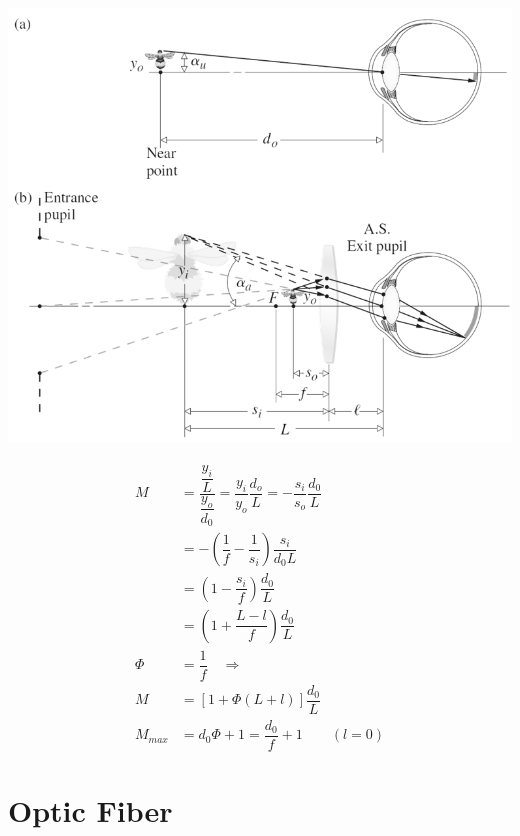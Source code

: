 \begin{minipage}[htbp]{0.7\linewidth}
  \includegraphics[width=\linewidth]{figures/magnifier.png}
\end{minipage}
\begin{minipage}[htbp]{0.3\linewidth}
  \begin{equation*}
    \begin{aligned}
      M &= \dfrac{\dfrac{y_i}{L} }{\dfrac{y_o}{d_0} } = \dfrac{y_i}{y_o} \dfrac{d_o}{L} = - \dfrac{s_i}{s_o} \dfrac{d_0}{L} \\
      &= - \left( \dfrac{1}{f} - \dfrac{1}{s_i}   \right) \dfrac{s_i}{d_0 L}  \\
      &= \left( 1 - \dfrac{s_i}{f}  \right) \dfrac{d_0}{L} \\
      &= \left( 1 + \dfrac{L - l}{f}  \right)\dfrac{d_0}{L} \\
      \Phi &= \dfrac{1}{f} \quad \Rightarrow \quad \\
      M &= \left[ 1 + \Phi \left( L + l \right) \right] \dfrac{d_0}{L} \\
      M_{max} &= d_0 \Phi + 1  = \dfrac{d_0}{f} + 1 \quad\quad \left( l = 0 \right)
    \end{aligned}
  \end{equation*}
\end{minipage}

\section{Optic Fiber}

